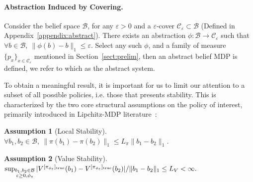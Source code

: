 \documentclass[twoside]{article}
\newtheorem{assumption}{Assumption}
\newcommand{\CAL}[1]{\mathcal{#1}}
\newcommand{\zyh}[1]{{\color{blue}{ [\textbf{Youheng:}} #1]}}
\begin{document}
\paragraph{Abstraction Induced by Covering.}
    Consider the belief space $\CAL{B}$, for any $\varepsilon>0$ and a $\varepsilon$-cover $\CAL{C}_\varepsilon\subset\CAL{B}$ (Defined in Appendix~\ref{appendix:abstract}). There exists an abstraction $\phi:\CAL{B}\to\CAL{C}_\varepsilon$ such that $\forall b\in\CAL{B},\ \|\phi(b)-b\|_1\leq \varepsilon$. Select any such $\phi$, and a family of measure $\{p_x\}_{x\in\CAL{C}_\varepsilon}$ mentioned in Section~\ref{sect:prelim}, then an abstract belief MDP is defined, we refer to which as the abstract system.

To obtain a meaningful result, it is important for us to limit our attention to a subset of all possible policies, i.e. those that presents stability. This is characterized by the two core structural assumptions on the policy of interest, primarily introduced in Lipchitz-MDP literature~\cite{pirotta2015policy, gelada2019deepmdp}:


\begin{assumption}[Local Stability]\label{asmp:lip_policy}
   $\forall b_1,b_2\in\CAL{B},\ \|\pi(b_1)-\pi(b_2)\|_1\leq L_{\pi}\|b_1-b_2\|_1$. 
\end{assumption}
\begin{assumption}[Value Stability]\label{asmp:Lipchitz_value}
    $
         \sup_{\substack{b_1,b_2\in\CAL{B}\\\varepsilon\geq 0,\phi_\varepsilon}}  |V^{[\pi_{\phi_\varepsilon}]_{\rm true}}\allowbreak{}(b_1)-V^{[\pi_{\phi_\varepsilon}]_{\rm true}}(b_2)|/{\|b_1-b_2\|_1}\leq L_V<\infty.
    $
\end{assumption}
\end{document}
